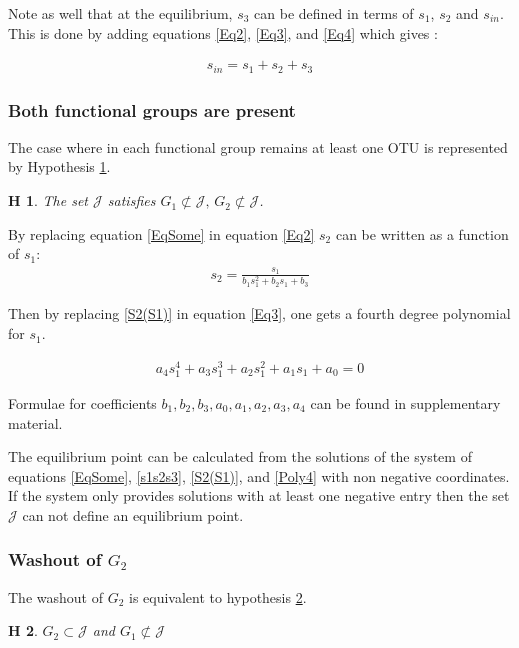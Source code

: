 \documentclass[processes,article,submit,moreauthors,pdftex]{Definitions/mdpi}
\newtheorem{hypo}{H}
\begin{document}
Note as well that at the equilibrium, $s_3$ can be defined in terms of $s_1$, $s_2$ and $s_{in}$. This is done by adding equations \eqref{Eq2}, \eqref{Eq3},  and \eqref{Eq4} which gives :

\begin{align}
s_{in} = s_1+s_2+s_3 \label{s1s2s3}
\end{align}

\subsubsection{Both functional groups are present}

The case where in each functional group remains at least one OTU is represented by Hypothesis \ref{hypothesis CN}.
\begin{hypo}The set $\mathcal{J}$ satisfies $ G_1 \not \subset \mathcal{J} , \, G_2 \not \subset \mathcal{J} $.
	\label{hypothesis CN}
\end{hypo} 


By replacing equation \eqref{EqSome} in equation \eqref{Eq2} $s_2$ can be written as a function of $s_1$:
\begin{align}
s_2 = \frac{s_1}{b_1s_1^2+b_2s_1+b_3} \label{S2(S1)}
\end{align}


Then by replacing  \eqref{S2(S1)} in equation \eqref{Eq3}, one gets a fourth degree polynomial for $s_1$. 

\begin{align}
\label{Poly4} a_4s_1^4+a_3s_1^3+a_2s_1^2+a_1s_1+a_0 = 0
\end{align}


Formulae for coefficients $b_1, b_2, b_3, a_0, a_1, a_2, a_3, a_4$ can be found in supplementary material. 

The equilibrium point can be calculated from the solutions of the system of equations \eqref{EqSome}, \eqref{s1s2s3}, \eqref{S2(S1)}, and \eqref{Poly4} with non negative coordinates. If the system only provides solutions with at least one negative entry then the set $\mathcal{J}$ can not define an equilibrium point.


\subsubsection{Washout of $G_2$}

The washout of $G_2$ is equivalent to  hypothesis \ref{hypothesis washout G2}.

\begin{hypo}
	$G_2 \subset \mathcal{J}$ and $G_1 \not \subset \mathcal{J}$
	\label{hypothesis washout G2}
\end{hypo} 
\end{document}
